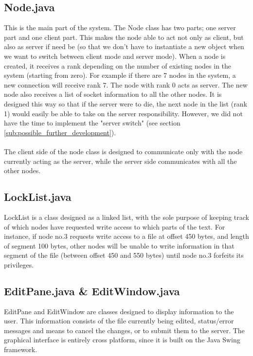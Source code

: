 \documentclass[12pt]{article}
\begin{document}
\subsection{Node.java} %
\label{sub:node_java}
This is the main part of the system. The Node class has two parts; one server part and one client part. This makes the node able to act not only as client, but also as server if need be (so that we don't have to instantiate a new object when we want to switch between client mode and server mode). When a node is created, it receives a rank depending on the number of existing nodes in the system (starting from zero). For example if there are 7 nodes in the system, a new connection will receive rank 7. The node with rank 0 acts as server. The new node also receives a list of socket information to all the other nodes. It is designed this way so that if the server were to die, the next node in the list (rank 1) would easily be able to take on the server responsibility. However, we did not have the time to implement the "server switch" (see section \ref{sub:possible_further_development}). 
\\\\
The client side of the node class is designed to communicate only with the node currently acting as the server, while the server side communicates with all the other nodes. 


\subsection{LockList.java} %
\label{sub:locklist_java}
LockList is a class designed as a linked list, with the sole purpose of keeping track of which nodes have requested write access to which parts of the text. For instance, if node no.3 requests write access to a file at offset 450 bytes, and length of segment 100 bytes, other nodes will be unable to write information in that segment of the file (between offset 450 and 550 bytes) until node no.3 forfeits its privileges.

\subsection{EditPane.java \& EditWindow.java} %
\label{sub:editpane}
EditPane and EditWindow are classes designed to display information to the user. This information consists of the file currently being edited, status/error messages and means to cancel the changes, or to submit them to the server. The graphical interface is entirely cross platform, since it is built on the Java Swing framework.
\end{document}
